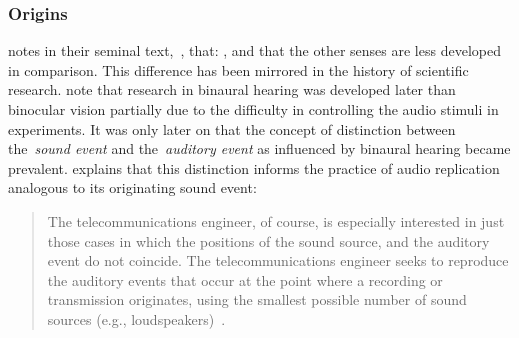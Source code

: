 \subsubsection{Origins}

\citet{blauert_spatial} notes in their seminal text,~\textit{}, that: , and that the other senses are less developed in comparison.
This difference has been mirrored in the history of scientific research.
\citet{wade_binaural} note that research in binaural hearing was developed later than binocular vision partially due to the difficulty in controlling the audio stimuli in experiments.
It was only later on that the concept of distinction between the~\textit{sound event} and the~\textit{auditory event} as influenced by binaural hearing became prevalent.
\citet{blauert_spatial} explains that this distinction informs the practice of audio replication analogous to its originating sound event:

\begin{quotation}
    The telecommunications engineer, of course, is especially interested in just those cases in which the positions of the sound source, and the auditory event do not coincide.
    The telecommunications engineer seeks to reproduce the auditory events that occur at the point where a recording or transmission originates, using the smallest possible number of sound sources (e.g., loudspeakers)~\citep{blauert_spatial}.
\end{quotation}


